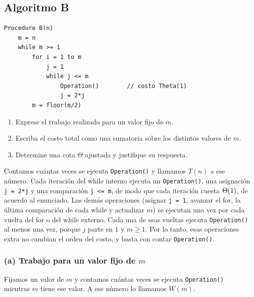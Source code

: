 \subsection{Algoritmo B}
\label{sec:act1b}

\begin{enunciado}
\begin{lstlisting}[language={}, numbers=none, frame=none, backgroundcolor={}]
Procedure B(n)
    m = n
    while m >= 1
        for i = 1 to m
            j = 1
            while j <= m
                Operation()        // costo Theta(1)
                j = 2*j
        m = floor(m/2)
\end{lstlisting}
\begin{enumerate}[label=(\alph*)]
  \item Exprese el trabajo realizado para un valor fijo de $m$.
  \item Escriba el costo total como una sumatoria sobre los distintos valores de $m$.
  \item Determine una cota $\Theta$ ajustada y justifique su respuesta.
\end{enumerate}
\end{enunciado}

Contamos cuántas veces se ejecuta \texttt{Operation()} y llamamos $T(n)$ a ese número.
Cada iteración del while interno ejecuta un \texttt{Operation()}, una asignación
\texttt{j = 2*j} y una comparación \texttt{j <= m}, de modo que cada iteración cuesta
$\Theta\!\left(1\right)$, de acuerdo al enunciado. Las demás operaciones (asignar \texttt{j = 1}, avanzar
el for, la última comparación de cada while y actualizar $m$) se ejecutan una vez por
cada vuelta del for o del while externo. Cada una de esas vueltas ejecuta
\texttt{Operation()} al menos una vez, porque $j$ parte en $1$ y $m \ge 1$. Por lo tanto,
esas operaciones extra no cambian el orden del costo, y basta con contar
\texttt{Operation()}.

\subsubsection*{(a) Trabajo para un valor fijo de $m$}

Fijamos un valor de $m$ y contamos cuántas veces se ejecuta \texttt{Operation()} mientras
$m$ tiene ese valor. A ese número lo llamamos $W(m)$.

